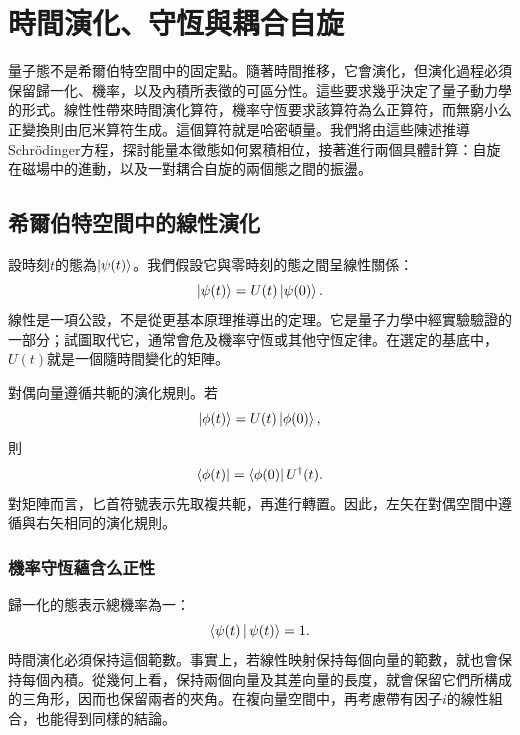 \chapter{時間演化、守恆與耦合自旋}

量子態不是希爾伯特空間中的固定點。隨著時間推移，它會演化，但演化過程必須保留歸一化、機率，以及內積所表徵的可區分性。這些要求幾乎決定了量子動力學的形式。線性性帶來時間演化算符，機率守恆要求該算符為么正算符，而無窮小么正變換則由厄米算符生成。這個算符就是哈密頓量。我們將由這些陳述推導Schr\"odinger方程，探討能量本徵態如何累積相位，接著進行兩個具體計算：自旋在磁場中的進動，以及一對耦合自旋的兩個態之間的振盪。

\section{希爾伯特空間中的線性演化}

設時刻\(t\)的態為\(\left\lvert\psi(t)\right\rangle\)。我們假設它與零時刻的態之間呈線性關係：
\begin{equation}
\left\lvert\psi(t)\right\rangle=U(t)\left\lvert\psi(0)\right\rangle.
\end{equation}
線性是一項公設，不是從更基本原理推導出的定理。它是量子力學中經實驗驗證的一部分；試圖取代它，通常會危及機率守恆或其他守恆定律。在選定的基底中，\(U(t)\)就是一個隨時間變化的矩陣。

對偶向量遵循共軛的演化規則。若
\begin{equation}
\left\lvert\phi(t)\right\rangle=U(t)\left\lvert\phi(0)\right\rangle,
\end{equation}
則
\begin{equation}
\left\langle\phi(t)\right\rvert=\left\langle\phi(0)\right\rvert U^\dagger(t).
\end{equation}
對矩陣而言，匕首符號表示先取複共軛，再進行轉置。因此，左矢在對偶空間中遵循與右矢相同的演化規則。

\subsection{機率守恆蘊含么正性}

歸一化的態表示總機率為一：
\begin{equation}
\left\langle\psi(t)\,\middle|\,\psi(t)\right\rangle=1.
\end{equation}
時間演化必須保持這個範數。事實上，若線性映射保持每個向量的範數，就也會保持每個內積。從幾何上看，保持兩個向量及其差向量的長度，就會保留它們所構成的三角形，因而也保留兩者的夾角。在複向量空間中，再考慮帶有因子\(i\)的線性組合，也能得到同樣的結論。

